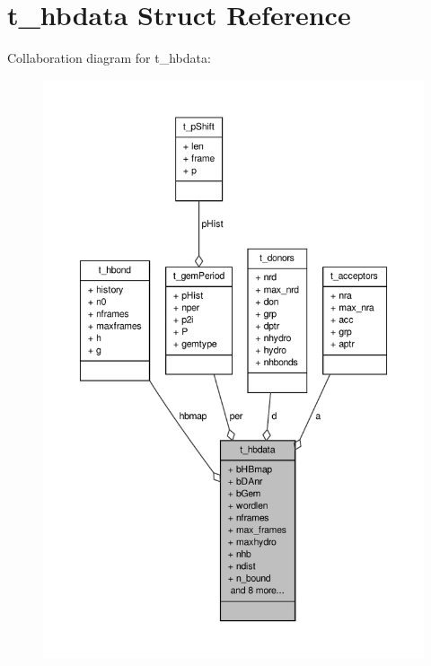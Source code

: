 \hypertarget{structt__hbdata}{\section{t\-\_\-hbdata \-Struct \-Reference}
\label{structt__hbdata}
}


\-Collaboration diagram for t\-\_\-hbdata\-:
\nopagebreak
\begin{figure}[H]
\begin{center}
\leavevmode
\includegraphics[width=350pt]{structt__hbdata__coll__graph}
\end{center}
\end{figure}
